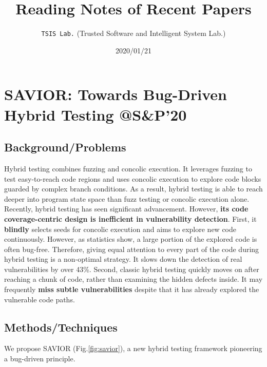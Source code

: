 \documentclass[]{article} %
\title{\textbf{Reading Notes of Recent Papers}}%
\author{\texttt{TSIS Lab.} (Trusted Software and Intelligent System Lab.)}
\date{2020/01/21} %
\begin{document}
\maketitle     %
\tableofcontents  %
\clearpage

\twocolumn
\section{SAVIOR: Towards Bug-Driven Hybrid Testing @S\&P'20
}
\subsection{Background/Problems}
Hybrid testing combines fuzzing and concolic
execution. It leverages fuzzing to test easy-to-reach code
regions and uses concolic execution to explore code blocks
guarded by complex branch conditions. As a result, hybrid testing
is able to reach deeper into program state space than fuzz
testing or concolic execution alone. Recently, hybrid testing has
seen significant advancement. However, \textbf{its code coverage-centric
design is inefficient in vulnerability detection}. First, it \textbf{blindly}
selects seeds for concolic execution and aims to explore new code
continuously. However, as statistics show, a large portion of the
explored code is often bug-free. Therefore, giving equal attention
to every part of the code during hybrid testing is a non-optimal
strategy. It slows down the detection of real vulnerabilities by
over 43\%. Second, classic hybrid testing quickly moves on after
reaching a chunk of code, rather than examining the hidden
defects inside. It may frequently \textbf{miss subtle vulnerabilities}
despite that it has already explored the vulnerable code paths.
\subsection{Methods/Techniques}
We propose SAVIOR (Fig.\ref{fig:savior}), a new hybrid testing framework pioneering
a bug-driven principle.
\end{document}
